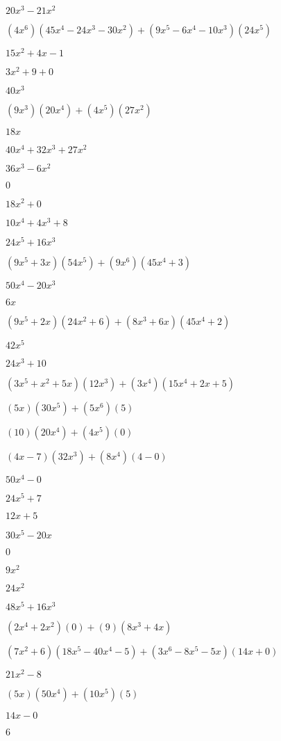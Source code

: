 \documentclass{article}
\begin{document}
\begin{multicols}{2}
$20x^{3}-21x^{2}$\item $(4x^{6})(45x^{4}-24x^{3}-30x^{2})+(9x^{5}-6x^{4}-10x^{3})(24x^{5})$\item $15x^{2}+4x-1$\item $3x^{2}+9+0$\item $40x^{3}$\item $(9x^{3})(20x^{4})+(4x^{5})(27x^{2})$\item $18x$\item $40x^{4}+32x^{3}+27x^{2}$\item $36x^{3}-6x^{2}$\item $0$\item $18x^{2}+0$\item $10x^{4}+4x^{3}+8$\item $24x^{5}+16x^{3}$\item $(9x^{5}+3x)(54x^{5})+(9x^{6})(45x^{4}+3)$\item $50x^{4}-20x^{3}$\item $6x$\item $(9x^{5}+2x)(24x^{2}+6)+(8x^{3}+6x)(45x^{4}+2)$\item $42x^{5}$\item $24x^{3}+10$\item $(3x^{5}+x^2+5x)(12x^{3})+(3x^{4})(15x^{4}+2x+5)$\item $(5x)(30x^{5})+(5x^{6})(5)$\item $(10)(20x^{4})+(4x^{5})(0)$\item $(4x-7)(32x^{3})+(8x^{4})(4-0)$\item $50x^{4}-0$\item $24x^{5}+7$\item $12x+5$\item $30x^{5}-20x$\item $0$\item $9x^{2}$\item $24x^{2}$\item $48x^{5}+16x^{3}$\item $(2x^{4}+2x^2)(0)+(9)(8x^{3}+4x)$\item $(7x^2+6)(18x^{5}-40x^{4}-5)+(3x^{6}-8x^{5}-5x)(14x+0)$\item $21x^{2}-8$\item $(5x)(50x^{4})+(10x^{5})(5)$\item $14x-0$\item $6$\item 
\end{multicols}
\end{document}
